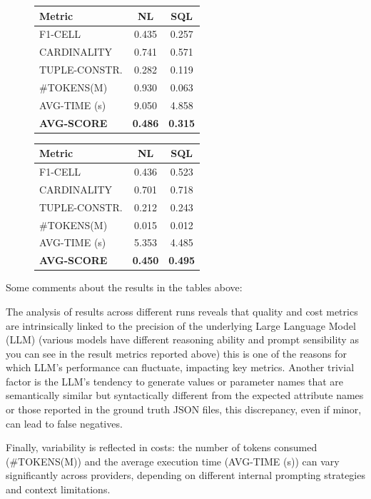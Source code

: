 \begin{figure}[h!]
    \centering
    
    \begin{minipage}[t]{0.49\textwidth}
        \centering
        \begin{tabular}{lcc}
            \toprule
                \textbf{Metric} & \textbf{NL} & \textbf{SQL} \\
            \midrule
                F1-CELL & 0.435 & 0.257 \\
                CARDINALITY & 0.741 & 0.571 \\
                TUPLE-CONSTR. & 0.282 & 0.119 \\
                \#TOKENS(M) & 0.930 & 0.063 \\
                AVG-TIME (s) & 9.050 & 4.858 \\
                \textbf{AVG-SCORE} & \textbf{0.486} & \textbf{0.315} \\
            \bottomrule
        \end{tabular}
        \label{gemini_results}
    \end{minipage}
    \hfill
    \begin{minipage}[t]{0.49\textwidth} 
        \centering
        \begin{tabular}{lcc}
            \toprule
                \textbf{Metric} & \textbf{NL} & \textbf{SQL} \\
            \midrule
                F1-CELL & 0.436 & 0.523 \\
                CARDINALITY & 0.701 & 0.718 \\
                TUPLE-CONSTR. & 0.212 & 0.243 \\
                \#TOKENS(M) & 0.015 & 0.012 \\
                AVG-TIME (s) & 5.353 & 4.485 \\
                \textbf{AVG-SCORE} & \textbf{0.450} & \textbf{0.495} \\
            \bottomrule
        \end{tabular}
    \label{watsonx_results}
    \end{minipage}
\end{figure}

Some comments about the results in the tables above:

The analysis of results across different runs reveals that quality and cost metrics are intrinsically linked to the precision of the underlying Large Language Model (LLM) (various models have different reasoning ability and prompt sensibility as you can see in the result metrics reported above) this is one of the reasons for which LLM's performance can fluctuate, impacting key metrics.
Another trivial factor is the LLM's tendency to generate values or parameter names that are semantically similar but syntactically different from the expected attribute names or those reported in the ground truth JSON files, this discrepancy, even if minor, can lead to false negatives.


Finally, variability is reflected in costs: the number of tokens consumed (\#TOKENS(M)) and the average execution time (AVG-TIME (s)) can vary significantly across providers, depending on different internal prompting strategies and context limitations.
